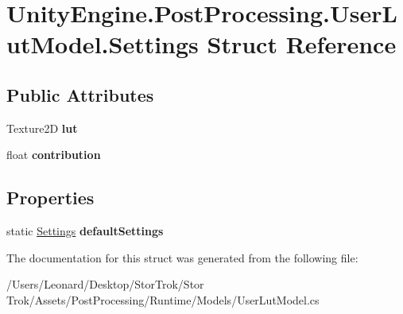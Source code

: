 \hypertarget{struct_unity_engine_1_1_post_processing_1_1_user_lut_model_1_1_settings}{}\section{Unity\+Engine.\+Post\+Processing.\+User\+Lut\+Model.\+Settings Struct Reference}
\label{struct_unity_engine_1_1_post_processing_1_1_user_lut_model_1_1_settings}
\subsection*{Public Attributes}
\begin{DoxyCompactItemize}
\item 
\mbox{\label{struct_unity_engine_1_1_post_processing_1_1_user_lut_model_1_1_settings_aacc55b006872312dfb56a19ec8b5e68a}} 
Texture2D {\bfseries lut}
\item 
\mbox{\label{struct_unity_engine_1_1_post_processing_1_1_user_lut_model_1_1_settings_aa1524dac501bc6c330d2e25298f1ddbd}} 
float {\bfseries contribution}
\end{DoxyCompactItemize}
\subsection*{Properties}
\begin{DoxyCompactItemize}
\item 
\mbox{\label{struct_unity_engine_1_1_post_processing_1_1_user_lut_model_1_1_settings_a9a4da996a1688ccaa11527b45937e91b}} 
static \hyperlink{struct_unity_engine_1_1_post_processing_1_1_user_lut_model_1_1_settings}{Settings} {\bfseries default\+Settings}
\end{DoxyCompactItemize}


The documentation for this struct was generated from the following file\+:\begin{DoxyCompactItemize}
\item 
/\+Users/\+Leonard/\+Desktop/\+Stor\+Trok/\+Stor Trok/\+Assets/\+Post\+Processing/\+Runtime/\+Models/User\+Lut\+Model.\+cs\end{DoxyCompactItemize}
